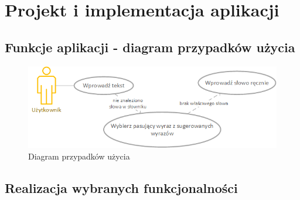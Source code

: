 \chapter{Projekt i implementacja aplikacji}

\section{Funkcje aplikacji - diagram przypadków użycia}

\begin{figure} [H]
	\centering
	\includegraphics[width=1\linewidth]{rozdzial03/diagram.png}
	\caption{Diagram przypadków użycia}
	\label{fig:diagUzycia}
\end{figure}

\section{Realizacja wybranych funkcjonalności}
